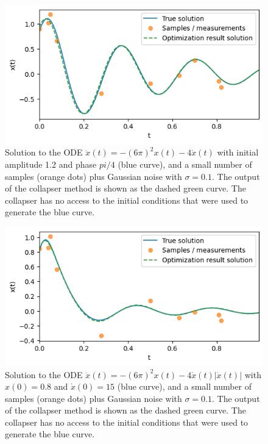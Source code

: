 \documentclass{article}
\begin{document}
\begin{figure}
\includegraphics{images/results/fit_damped_sho.png}
\centering
\caption{
Solution to the ODE $\ddot{x}(t) = - (6\pi)^2 x(t) - 4 \dot{x}(t)$ with initial amplitude 1.2 and phase $pi/4$ (blue curve), and a small number of samples (orange dots) plus Gaussian noise with $\sigma = 0.1$.
The output of the collapser method is shown as the dashed green curve.
The collapser has no access to the initial conditions that were used to generate the blue curve.
}
\label{fig:fit_damped_sho}
\end{figure}

\begin{figure}
\includegraphics{images/results/fit_qd_osc.png}
\centering
\caption{
Solution to the ODE $\ddot{x}(t) = - (6\pi)^2 x(t) - 4 \dot{x}(t) \left| \dot{x}(t) \right|$ with $x(0) = 0.8$ and $\dot{x}(0) = 15$ (blue curve), and a small number of samples (orange dots) plus Gaussian noise with $\sigma = 0.1$.
The output of the collapser method is shown as the dashed green curve.
The collapser has no access to the initial conditions that were used to generate the blue curve.
}
\label{fig:fit_qd_osc}
\end{figure}
\end{document}
